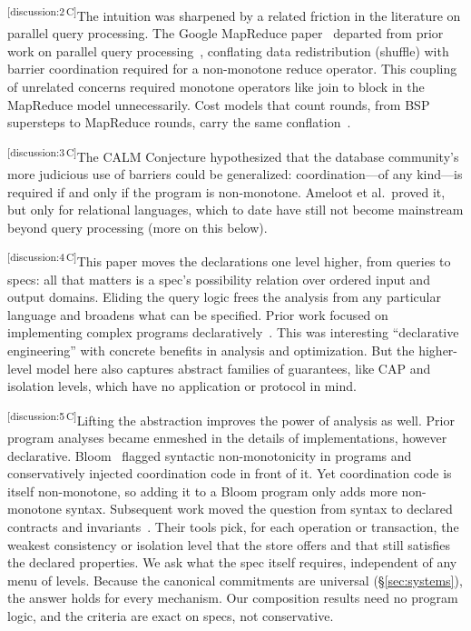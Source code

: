 \documentclass[sigconf]{cidr-2027}
\theoremstyle{remark}
\newcommand{\commitments}{commitments\xspace}
\newcommand{\cxtag}[2]{\textsuperscript{\textsf{\tiny[#1\,#2]}}}
\begin{document}
\color{black!45}\cxtag{discussion:2}{C}The intuition was sharpened by a related friction in the literature on parallel
query processing. The Google MapReduce
paper~\cite{dean2004mapreduce} departed from prior work on parallel query
processing~\cite{wilschut1991dataflow,graefe1990volcano}, conflating data
redistribution (shuffle) with barrier coordination required for a non-monotone
reduce operator. This coupling of unrelated concerns required monotone operators
like join to block in the MapReduce model unnecessarily.  Cost models that count
rounds, from BSP supersteps to MapReduce rounds, carry the same
conflation~\cite{valiant1990bsp,karloff2010mrc}.\color{black}

\color{black!45}\cxtag{discussion:3}{C}The CALM Conjecture hypothesized that the database community's more judicious
use of barriers could be generalized: coordination---of any kind---is required
if and only if the program is non-monotone. Ameloot et al.\
proved it, but only for relational languages, which to date have
still not become mainstream beyond query processing (more on this below).\color{black}

\color{black!45}\cxtag{discussion:4}{C}This paper moves the declarations one level higher, from queries to
specs: all that matters is a spec's possibility relation over ordered input
and output domains.  Eliding the query logic frees the analysis from any particular
language and broadens what can be specified. Prior work focused on implementing
complex programs
declaratively~\cite{loo2005overlays,loo2009declarative,chu2007declarative,alvaro2011bloom}.
This was interesting ``declarative engineering'' with concrete benefits in
analysis and optimization. But the higher-level model here also captures abstract
families of guarantees, like CAP and isolation levels, which have no application or
protocol in mind.\color{black}

\color{black!45}\cxtag{discussion:5}{C}Lifting the abstraction improves the power of analysis as well. Prior program
analyses became enmeshed in the details of implementations, however
declarative. Bloom~\cite{alvaro2011bloom} flagged syntactic non-monotonicity in
programs and conservatively injected coordination code in front of it.  Yet
coordination code is itself non-monotone, so adding it to a Bloom program only
adds more non-monotone syntax.  Subsequent work moved the question from syntax to declared contracts and
invariants~\cite{sivaramakrishnan2015quelea,kaki2018alone}.  Their tools pick,
for each operation or transaction, the weakest consistency or isolation level
that the store offers and that still satisfies the declared properties.  We
ask what the spec itself requires, independent of any menu of
levels.  Because the canonical \commitments are universal
(\S\ref{sec:systems}), the answer holds for every mechanism.  Our
composition results need no program logic, and the criteria are exact on
specs, not conservative.\color{black}
\end{document}
